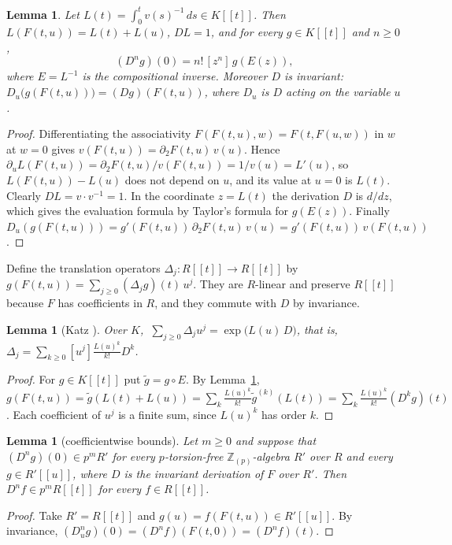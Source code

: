\documentclass[11pt]{amsart}
\newtheorem{lemma}[thm]{Lemma}
\theoremstyle{definition}
\theoremstyle{remark}
\newcommand{\Z}{\mathbb Z}
\begin{document}
\begin{lemma}\label{lem:log}
Let $L(t)=\int_0^tv(s)^{-1}\,ds\in K[[t]]$. Then $L(F(t,u))=L(t)+L(u)$, $DL=1$, and for every $g\in K[[t]]$ and $n\ge0$,
\[
 (D^ng)(0)=n!\,[z^n]\,g(E(z)),
\]
where $E=L^{-1}$ is the compositional inverse. Moreover $D$ is invariant: $D_u\bigl(g(F(t,u))\bigr)=(Dg)(F(t,u))$, where $D_u$ is $D$ acting on the variable $u$.
\end{lemma}

\begin{proof}
Differentiating the associativity $F(F(t,u),w)=F(t,F(u,w))$ in $w$ at $w=0$ gives $v(F(t,u))=\partial_2F(t,u)\,v(u)$. Hence $\partial_u L(F(t,u))=\partial_2F(t,u)/v(F(t,u))=1/v(u)=L'(u)$, so $L(F(t,u))-L(u)$ does not depend on $u$, and its value at $u=0$ is $L(t)$. Clearly $DL=v\cdot v^{-1}=1$. In the coordinate $z=L(t)$ the derivation $D$ is $d/dz$, which gives the evaluation formula by Taylor's formula for $g(E(z))$. Finally $D_u(g(F(t,u)))=g'(F(t,u))\,\partial_2F(t,u)\,v(u)=g'(F(t,u))\,v(F(t,u))$.
\end{proof}

Define the translation operators $\Delta_j:R[[t]]\to R[[t]]$ by $g(F(t,u))=\sum_{j\ge0}(\Delta_jg)(t)\,u^j$. They are $R$-linear and preserve $R[[t]]$ because $F$ has coefficients in $R$, and they commute with $D$ by invariance.

\begin{lemma}[{Katz \cite[Corollary 1.8]{Katz81}}]\label{lem:katz}
Over $K$, $\ \sum_{j\ge0}\Delta_ju^j=\exp\bigl(L(u)\,D\bigr)$, that is, $\Delta_j=\sum_{k\ge0}[u^j]\frac{L(u)^k}{k!}D^k$.
\end{lemma}

\begin{proof}
For $g\in K[[t]]$ put $\tilde g=g\circ E$. By Lemma~\ref{lem:log}, $g(F(t,u))=\tilde g(L(t)+L(u))=\sum_k\frac{L(u)^k}{k!}\tilde g^{(k)}(L(t))=\sum_k\frac{L(u)^k}{k!}(D^kg)(t)$. Each coefficient of $u^j$ is a finite sum, since $L(u)^k$ has order $k$.
\end{proof}

\begin{lemma}[coefficientwise bounds]\label{lem:coeff}
Let $m\ge0$ and suppose that $(D^ng)(0)\in p^mR'$ for every $p$-torsion-free $\Z_{(p)}$-algebra $R'$ over $R$ and every $g\in R'[[u]]$, where $D$ is the invariant derivation of $F$ over $R'$. Then $D^nf\in p^mR[[t]]$ for every $f\in R[[t]]$.
\end{lemma}

\begin{proof}
Take $R'=R[[t]]$ and $g(u)=f(F(t,u))\in R'[[u]]$. By invariance, $(D_u^ng)(0)=(D^nf)(F(t,0))=(D^nf)(t)$.
\end{proof}
\end{document}
